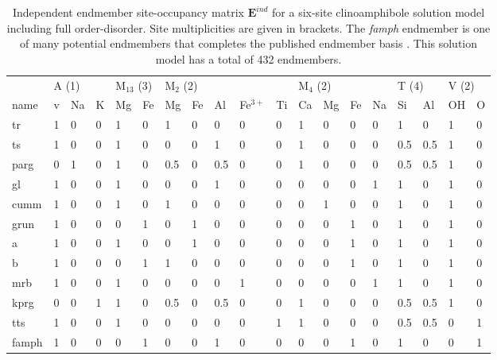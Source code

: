 \documentclass[preprint,12pt]{elsarticle}
\begin{document}
\begin{table}[htb!]
\centering
\scriptsize
\setlength{\tabcolsep}{4pt}
\begin{tabular}{l|lll|ll|lllll|llll|ll|ll}
               & \multicolumn{3}{l}{A (1)} & \multicolumn{2}{l}{M$_{13}$ (3)} & \multicolumn{5}{l}{M$_2$ (2)} & \multicolumn{4}{l}{M$_4$ (2)} & \multicolumn{2}{l}{T (4)} & \multicolumn{2}{l}{V (2)}   \\
name & v & Na & K & Mg & Fe & Mg & Fe & Al & Fe$^{3+}$ & Ti & Ca & Mg & Fe & Na & Si & Al & OH & O \\
\hline
tr & 1 & 0 & 0 & 1 & 0 & 1 & 0 & 0 & 0 & 0 & 1 & 0 & 0 & 0 & 1 & 0 & 1 & 0 \\
ts & 1 & 0 & 0 & 1 & 0 & 0 & 0 & 1 & 0 & 0 & 1 & 0 & 0 & 0 & 0.5 & 0.5 & 1 & 0 \\ 
parg & 0 & 1 & 0 & 1 & 0 & 0.5 & 0 & 0.5 & 0 & 0 & 1 & 0 & 0 & 0 & 0.5 & 0.5 & 1 & 0 \\ 
gl & 1 & 0 & 0 & 1 & 0 & 0 & 0 & 1 & 0 & 0 & 0 & 0 & 0 & 1 & 1 & 0 & 1 & 0 \\ 
cumm & 1 & 0 & 0 & 1 & 0 & 1 & 0 & 0 & 0 & 0 & 0 & 1 & 0 & 0 & 1 & 0 & 1 & 0 \\
grun & 1 & 0 & 0 & 0 & 1 & 0 & 1 & 0 & 0 & 0 & 0 & 0 & 1 & 0 & 1 & 0 & 1 & 0 \\
a & 1 & 0 & 0 & 1 & 0 & 0 & 1 & 0 & 0 & 0 & 0 & 0 & 1 & 0 & 1 & 0 & 1 & 0 \\ 
b & 1 & 0 & 0 & 0 & 1 & 1 & 0 & 0 & 0 & 0 & 0 & 0 & 1 & 0 & 1 & 0 & 1 & 0 \\ 
mrb & 1 & 0 & 0 & 1 & 0 & 0 & 0 & 0 & 1 & 0 & 0 & 0 & 0 & 1 & 1 & 0 & 1 & 0 \\ 
kprg & 0 & 0 & 1 & 1 & 0 & 0.5 & 0 & 0.5 & 0 & 0 & 1 & 0 & 0 & 0 & 0.5 & 0.5 & 1 & 0 \\
tts & 1 & 0 & 0 & 1 & 0 & 0 & 0 & 0 & 0 & 1 & 1 & 0 & 0 & 0 & 0.5 & 0.5 & 0 & 1 \\
famph & 1 & 0 & 0 & 0 & 1 & 0 & 0 & 1 & 0 & 0 & 0 & 0 & 1 & 0 & 1 & 0 & 0 & 1 
\end{tabular}
\caption{Independent endmember site-occupancy matrix $\boldsymbol{E}^{\textit{ind}}$ for a six-site clinoamphibole solution model including full order-disorder. Site multiplicities are given in brackets. The \emph{famph} endmember is one of many potential endmembers that completes the published endmember basis \citep{Green2016,Holland2018}. This solution model has a total of 432 endmembers.}
\label{tab:camph_matrix}
\end{table}
\end{document}
